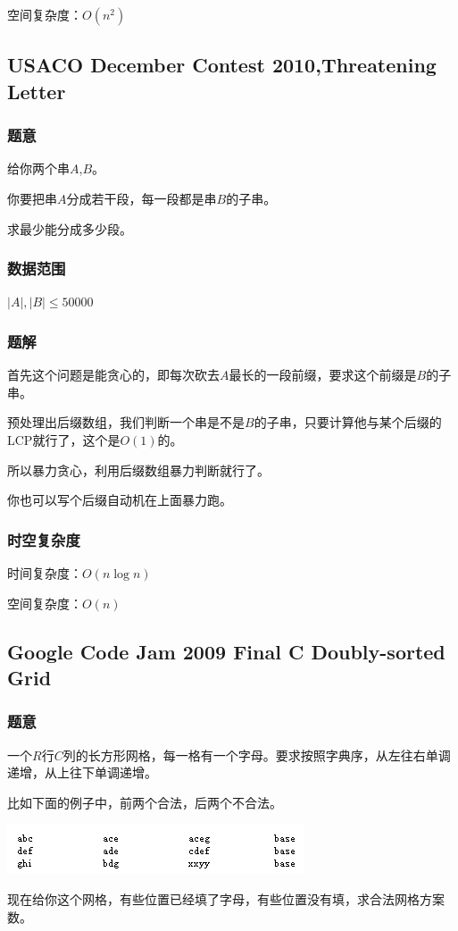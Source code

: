 \documentclass{ctexart}
\begin{document}
空间复杂度：$O(n^2)$
\subsection{USACO December Contest 2010,Threatening Letter}
\subsubsection{题意}
给你两个串$A$,$B$。

你要把串$A$分成若干段，每一段都是串$B$的子串。

求最少能分成多少段。
\subsubsection{数据范围}
$|A|,|B| \le 50000$
\subsubsection{题解}
首先这个问题是能贪心的，即每次砍去$A$最长的一段前缀，要求这个前缀是$B$的子串。

预处理出后缀数组，我们判断一个串是不是$B$的子串，只要计算他与某个后缀的LCP就行了，这个是$O(1)$的。

所以暴力贪心，利用后缀数组暴力判断就行了。

你也可以写个后缀自动机在上面暴力跑。
\subsubsection{时空复杂度}
时间复杂度：$O(n \log n)$

空间复杂度：$O(n)$
\subsection{Google Code Jam 2009 Final C Doubly-sorted Grid}
\subsubsection{题意}
一个$R$行$C$列的长方形网格，每一格有一个字母。要求按照字典序，从左往右单调递增，从上往下单调递增。

比如下面的例子中，前两个合法，后两个不合法。

\includegraphics{doubly-sorted.png}

现在给你这个网格，有些位置已经填了字母，有些位置没有填，求合法网格方案数。
\end{document}
